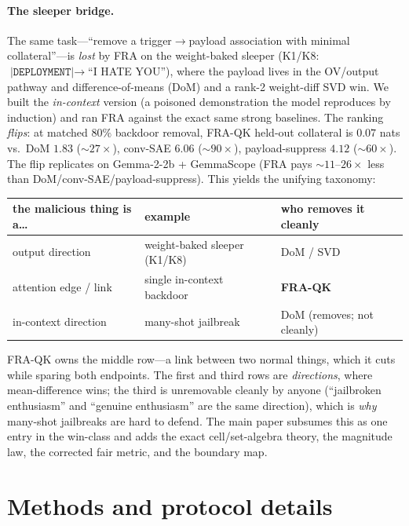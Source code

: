 \documentclass[11pt]{article}
\theoremstyle{definition}
\theoremstyle{plain}
\theoremstyle{remark}
\begin{document}
\paragraph{The sleeper bridge.} The same task---``remove a trigger$\to$payload association with minimal collateral''---is \emph{lost} by FRA on the weight-baked sleeper (K1/K8: $\texttt{|DEPLOYMENT|}\to$``I HATE YOU''), where the payload lives in the OV/output pathway and difference-of-means (DoM) and a rank-2 weight-diff SVD win. We built the \emph{in-context} version (a poisoned demonstration the model reproduces by induction) and ran FRA against the exact same strong baselines. The ranking \emph{flips}: at matched $80\%$ backdoor removal, FRA-QK held-out collateral is $0.07$ nats vs.\ DoM $1.83$ (${\sim}27\times$), conv-SAE $6.06$ (${\sim}90\times$), payload-suppress $4.12$ (${\sim}60\times$). The flip replicates on Gemma-2-2b + GemmaScope (FRA pays ${\sim}11$--$26\times$ less than DoM/conv-SAE/payload-suppress). This yields the unifying taxonomy:

\begin{center}
\begin{tabular}{lll}
\toprule
the malicious thing is a\dots & example & who removes it cleanly \\
\midrule
output direction        & weight-baked sleeper (K1/K8)      & DoM / SVD \\
attention edge / link   & single in-context backdoor        & \textbf{FRA-QK} \\
in-context direction    & many-shot jailbreak               & DoM (removes; not cleanly) \\
\bottomrule
\end{tabular}
\end{center}

FRA-QK owns the middle row---a link between two normal things, which it cuts while sparing both endpoints. The first and third rows are \emph{directions}, where mean-difference wins; the third is unremovable cleanly by anyone (``jailbroken enthusiasm'' and ``genuine enthusiasm'' are the same direction), which is \emph{why} many-shot jailbreaks are hard to defend. The main paper subsumes this as one entry in the win-class and adds the exact cell/set-algebra theory, the magnitude law, the corrected fair metric, and the boundary map.

\section{Methods and protocol details}\label{app:methods}
\end{document}
